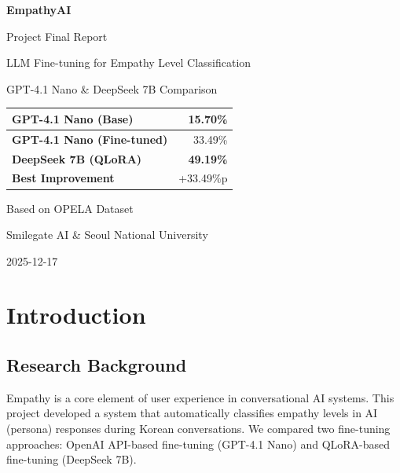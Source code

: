 \documentclass[11pt, a4paper]{article}
\begin{document}
\begin{titlepage}
    \centering
    \vspace*{2cm}
    {\Huge\bfseries\color{primary} EmpathyAI\par}
    \vspace{0.5cm}
    {\LARGE Project Final Report\par}
    \vspace{1cm}
    {\large LLM Fine-tuning for Empathy Level Classification\par}
    \vspace{0.3cm}
    {\large GPT-4.1 Nano \& DeepSeek 7B Comparison\par}
    \vspace{2cm}
    
    \begin{tabular}{|l|r|}
    \hline
    \textbf{GPT-4.1 Nano (Base)} & 15.70\% \\
    \hline
    \textbf{GPT-4.1 Nano (Fine-tuned)} & 33.49\% \\
    \hline
    \textbf{DeepSeek 7B (QLoRA)} & \textcolor{accent}{\textbf{49.19\%}} \\
    \hline
    \textbf{Best Improvement} & \textcolor{accent}{+33.49\%p} \\
    \hline
    \end{tabular}
    
    \vspace{2cm}
    {\large Based on OPELA Dataset\par}
    {\large Smilegate AI \& Seoul National University\par}
    
    \vfill
    {\large 2025-12-17\par}
\end{titlepage}

\tableofcontents
\newpage

\section{Introduction}

\subsection{Research Background}
Empathy is a core element of user experience in conversational AI systems. This project developed a system that automatically classifies empathy levels in AI (persona) responses during Korean conversations. We compared two fine-tuning approaches: OpenAI API-based fine-tuning (GPT-4.1 Nano) and QLoRA-based fine-tuning (DeepSeek 7B).
\end{document}
